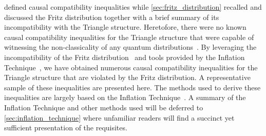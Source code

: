 \documentclass[aps, 10pt, english, twoside, pra, nofootinbib, tightenlines, longbibliography, superscriptaddress]{revtex4-1}
\begin{document}
     defined causal compatibility inequalities while \cref{sec:fritz_distribution} recalled and discussed the Fritz distribution together with a brief summary of its incompatibility with the Triangle structure. Heretofore, there were no known causal compatibility inequalities for the Triangle structure that were capable of witnessing the non-classicality of any quantum distributions~\cite{Inflation}. By leveraging the incompatibility of the Fritz distribution~\cite{Fritz_2012} and tools provided by the Inflation Technique~\cite{Inflation}, we have obtained numerous causal compatibility inequalities for the Triangle structure that are violated by the Fritz distribution. A representative sample of these inequalities are presented here. The methods used to derive these inequalities are largely based on the Inflation Technique~\cite{Inflation}. A summary of the Inflation Technique and other methods used will be deferred to \cref{sec:inflation_technique} where unfamiliar readers will find a succinct yet sufficient presentation of the requisites.
\end{document}
